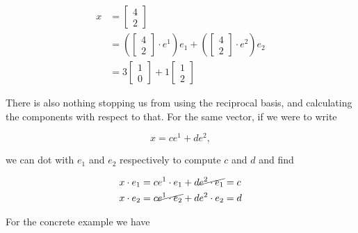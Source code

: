 \begin{equation}\label{eqn:grahamSchmidtLorentz:230}
\begin{aligned}
x &=
\begin{bmatrix}
4 \\
2
\end{bmatrix}  \\
&=
\left(
\begin{bmatrix}
4 \\
2
\end{bmatrix}
\cdot e^1
\right)
e_1
+
\left(
\begin{bmatrix}
4 \\
2
\end{bmatrix}
\cdot e^2
\right)
e_2 \\
&= 3
\begin{bmatrix}
1 \\
0
\end{bmatrix}
+
1
\begin{bmatrix}
1 \\
2
\end{bmatrix}
\end{aligned}
\end{equation}

There is also nothing stopping us from using the reciprocal basis, and calculating the components with respect to that.  For the same vector, if we were to write

\begin{equation}\label{eqn:grahamSchmidtLorentz:250}
x = c e^1 + d e^2,
\end{equation}

we can dot with $e_1$ and $e_2$ respectively to compute $c$ and $d$ and find

\begin{equation}\label{eqn:grahamSchmidtLorentz:360}
\begin{aligned}
x \cdot e_1 &= c e^1 \cdot e_1 + d \cancel{e^2 \cdot e_1} = c \\
x \cdot e_2 &= c \cancel{e^1 \cdot e_2} + d e^2 \cdot e_2 = d
\end{aligned}
\end{equation}

For the concrete example we have

